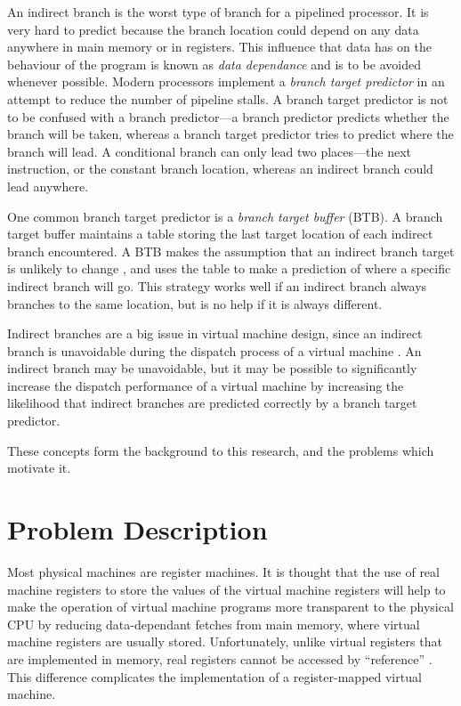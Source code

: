 			An indirect branch is the worst type of branch for a pipelined processor. It is very hard to predict because the branch location could depend on any data anywhere in main memory or in registers. This influence that data has on the behaviour of the program is known as \emph{data dependance} and is to be avoided whenever possible. Modern processors implement a \emph{branch target predictor} in an attempt to reduce the number of pipeline stalls. A branch target predictor is not to be confused with a branch predictor---a branch predictor predicts whether the branch will be taken, whereas a branch target predictor tries to predict where the branch will lead. A conditional branch can only lead two places---the next instruction, or the constant branch location, whereas an indirect branch could lead anywhere.
			
			One common branch target predictor is a \emph{branch target buffer} (BTB). A branch target buffer maintains a table storing the last target location of each indirect branch encountered. A BTB makes the assumption that an indirect branch target is unlikely to change  \citep{yeti}, and uses the table to make a prediction of where a specific indirect branch will go. This strategy works well if an indirect branch always branches to the same location, but is no help if it is always different.
			
			Indirect branches are a big issue in virtual machine design, since an indirect branch is unavoidable during the dispatch process of a virtual machine \citep{structureinterpreters}. An indirect branch may be unavoidable, but it may be possible to significantly increase the dispatch performance of a virtual machine by increasing the likelihood that indirect branches are predicted correctly by a branch target predictor.
			
			These concepts form the background to this research, and the problems which motivate it.
	
	\section{Problem Description}
		Most physical machines are register machines. It is thought that the use of real machine registers to store the values of the virtual machine registers will help to make the operation of virtual machine programs more transparent to the physical CPU by reducing data-dependant fetches from main memory, where virtual machine registers are usually stored. Unfortunately, unlike virtual registers that are implemented in memory, real registers cannot be accessed by ``reference'' \citep{caseregistervm}. This difference complicates the implementation of a register-mapped virtual machine.
		
